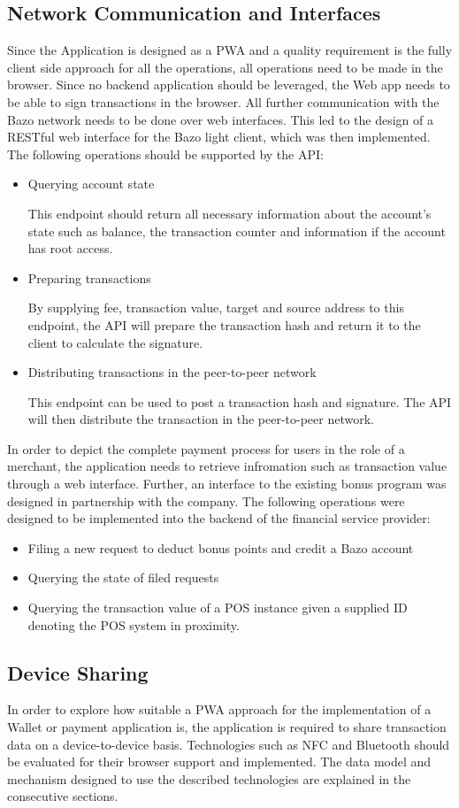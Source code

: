 \subsection{Network Communication and Interfaces}\label{networkandinterfaces}
Since the Application is designed as a PWA and a quality requirement is the fully client side approach for all the operations, all operations need to be made in the browser. Since no backend application should be leveraged, the Web app needs to be able to sign transactions in the browser. All further communication with the Bazo network needs to be done over web interfaces. This led to the design of a RESTful web interface for the Bazo light client, which was then implemented. The following operations should be supported by the API:
\begin{itemize}
\item Querying account state

This endpoint should return all necessary information about the account's state such as balance, the transaction counter and information if the account has root access.
\item Preparing transactions

By supplying fee, transaction value, target and source address to this endpoint, the API will prepare the transaction hash and return it to the client to calculate the signature.
\item Distributing transactions in the peer-to-peer network

This endpoint can be used to post a transaction hash and signature. The API will then distribute the transaction in the peer-to-peer network.
\end{itemize}
In order to depict the complete payment process for users in the role of a merchant, the application needs to retrieve infromation such as transaction value through a web interface. Further, an interface to the existing bonus program was designed in partnership with the company. The following operations were designed to be implemented into the backend of the financial service provider:
\begin{itemize}
\item Filing a new request to deduct bonus points and credit a Bazo account
\item Querying the state of filed requests
\item Querying the transaction value of a POS instance given a supplied ID denoting the POS system in proximity.
\end{itemize}
\subsection{Device Sharing}
In order to explore how suitable a PWA approach for the implementation of a Wallet or payment application is, the application is required to share transaction data on a device-to-device basis. Technologies such as NFC and Bluetooth should be evaluated for their browser support and implemented. 
The data model and mechanism designed to use the described technologies are explained in the consecutive sections.
